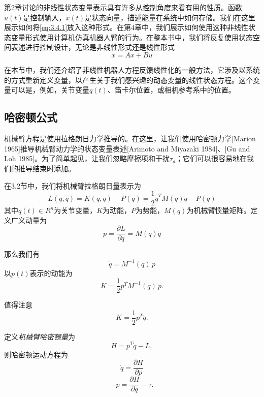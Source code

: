 \documentclass[12pt,a4paper]{ctexart}
\begin{document}
第2章讨论的非线性状态变量表示具有许多从控制角度来看有用的性质。函数$u(t)$是控制输入，$x(t)$是状态向量，描述能量在系统中如何存储。我们在这里展示如何将\eqref{eq:3.4.1}放入这种形式。在第4章中，我们展示如何使用这种非线性状态变量形式使用计算机仿真机器人臂的行为。在整本书中，我们将反复使用状态空间表述进行控制设计，无论是非线性形式还是线性形式
\begin{equation}
\dot{x} = Ax + Bu
\end{equation}

在本节中，我们还介绍了非线性机器人方程反馈线性化的一般方法，它涉及以系统的方式重新定义变量，以产生关于我们感兴趣的动态变量的线性状态方程。这个变量可以是，例如，关节变量$q(t)$、笛卡尔位置，或相机参考系中的位置。

\subsection{哈密顿公式}

机械臂方程是使用拉格朗日力学推导的。在这里，让我们使用哈密顿力学[Marion 1965]推导机械臂动力学的状态变量表述[Arimoto and Miyazaki 1984]、[Gu and Loh 1985]。为了简单起见，让我们忽略摩擦项和干扰$\tau_d$；它们可以很容易地在我们的推导结束时添加。

在3.2节中，我们将机械臂拉格朗日量表示为
\begin{equation}
L(q,\dot{q}) = K(q,\dot{q}) - P(q) = \frac{1}{2}\dot{q}^T M(q)\dot{q} - P(q)
\end{equation}
其中$q(t) \in R^n$为关节变量，$K$为动能，$P$为势能，$M(q)$为机械臂惯量矩阵。定义广义动量为
\begin{equation}
p = \frac{\partial L}{\partial \dot{q}} = M(q)\dot{q}
\end{equation}

那么我们有
\begin{equation}\label{eq:3.4.8}
\dot{q} = M^{-1}(q)\,p
\end{equation}
以$p(t)$表示的动能为
\begin{equation}\label{eq:3.4.9}
K = \frac{1}{2}p^T M^{-1}(q)\,p.
\end{equation}

值得注意
\begin{equation}\label{eq:3.4.10}
K = \frac{1}{2}p^T \dot{q}.
\end{equation}

定义\emph{机械臂哈密顿量}为
\begin{equation}\label{eq:3.4.11}
H = p^T \dot{q} - L,
\end{equation}
则哈密顿运动方程为
\begin{equation}\label{eq:3.4.12}
\dot{q} = \frac{\partial H}{\partial p}
\end{equation}
\begin{equation}\label{eq:3.4.13}
-\dot{p} = \frac{\partial H}{\partial q} - \tau.
\end{equation}
\end{document}
